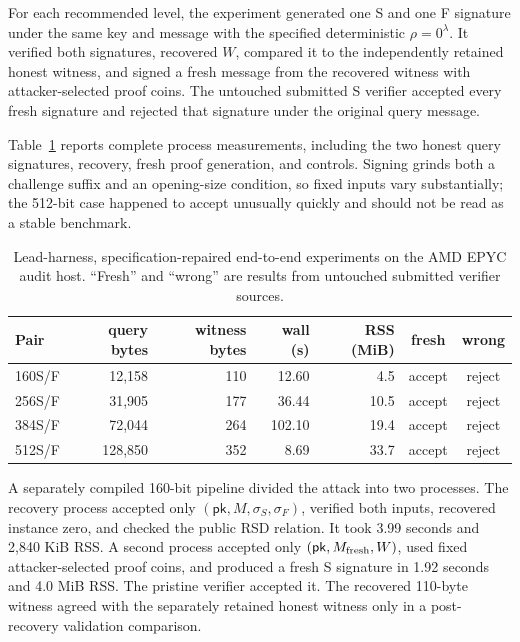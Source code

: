 \documentclass[11pt,a4paper]{article}
\newcommand{\pk}{\ensuremath{\mathsf{pk}}}
\begin{document}
For each recommended level, the experiment generated one S and one F signature
under the same key and message with the specified deterministic
$\rho=0^\lambda$.  It verified both signatures, recovered $W$, compared it to
the independently retained honest witness, and signed a fresh message from the
recovered witness with attacker-selected proof coins.  The untouched submitted
S verifier accepted every fresh signature and rejected that signature under the
original query message.

Table~\ref{tab:results} reports complete process measurements, including the
two honest query signatures, recovery, fresh proof generation, and controls.
Signing grinds both a challenge suffix and an opening-size condition, so fixed
inputs vary substantially; the 512-bit case happened to accept unusually
quickly and should not be read as a stable benchmark.

\begin{table}[ht]
\centering
\caption{Lead-harness, specification-repaired end-to-end experiments on the AMD
EPYC audit host. ``Fresh'' and ``wrong'' are results from untouched submitted
verifier sources.}
\label{tab:results}
\begin{tabular}{lrrrrcc}
\toprule
Pair & query bytes & witness bytes & wall (s) & RSS (MiB) & fresh & wrong\\
\midrule
160S/F & 12,158  & 110 & 12.60  & 4.5  & accept & reject\\
256S/F & 31,905  & 177 & 36.44  & 10.5 & accept & reject\\
384S/F & 72,044  & 264 & 102.10 & 19.4 & accept & reject\\
512S/F & 128,850 & 352 & 8.69   & 33.7 & accept & reject\\
\bottomrule
\end{tabular}
\end{table}

A separately compiled 160-bit pipeline divided the attack into two processes.
The recovery process accepted only $(\pk,M,\sigma_S,\sigma_F)$, verified both
inputs, recovered instance zero, and checked the public RSD relation.  It took
3.99 seconds and 2,840 KiB RSS.  A second process accepted only
$(\pk,M_{\rm fresh},W)$, used fixed attacker-selected proof coins, and produced
a fresh S signature in 1.92 seconds and 4.0 MiB RSS.  The pristine verifier
accepted it.  The recovered 110-byte witness agreed with the separately retained
honest witness only in a post-recovery validation comparison.
\end{document}

